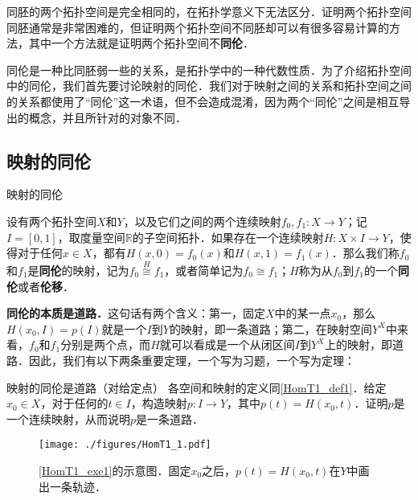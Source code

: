 
同胚的两个拓扑空间是完全相同的，在拓扑学意义下无法区分．证明两个拓扑空间同胚通常是非常困难的，但证明两个拓扑空间不同胚却可以有很多容易计算的方法，其中一个方法就是证明两个拓扑空间不\textbf{同伦}．

同伦是一种比同胚弱一些的关系，是拓扑学中的一种代数性质．为了介绍拓扑空间中的同伦，我们首先要讨论映射的同伦．我们对于映射之间的关系和拓扑空间之间的关系都使用了“同伦”这一术语，但不会造成混淆，因为两个“同伦”之间是相互导出的概念，并且所针对的对象不同．

\subsection{映射的同伦}

\begin{definition}{映射的同伦}\label{HomT1_def1}

设有两个拓扑空间$X$和$Y$，以及它们之间的两个连续映射$f_0, f_1:X\rightarrow Y$；记$I=[0, 1]$，取度量空间$\mathbb{R}$的子空间拓扑．如果存在一个连续映射$H: X\times I\rightarrow Y$，使得对于任何$x\in X$，都有$H(x, 0)=f_0(x)$和$H(x, 1)=f_1(x)$．那么我们称$f_0$和$f_1$是\textbf{同伦}的映射，记为$f_0\overset{H}{\cong} f_1$，或者简单记为$f_0\cong f_1$；$H$称为从$f_0$到$f_1$的一个\textbf{同伦}或者\textbf{伦移}．

\end{definition}

\textbf{同伦的本质是道路．}这句话有两个含义：第一，固定$X$中的某一点$x_0$，那么$H(x_0, I)=p(I)$就是一个$I$到$Y$的映射，即一条道路；第二，在映射空间$Y^X$中来看，$f_0$和$f_1$分别是两个点，而$H$就可以看成是一个从闭区间$I$到$Y^X$上的映射，即道路．因此，我们有以下两条重要定理，一个写为习题，一个写为定理：

\begin{exercise}{映射的同伦是道路（对给定点）}\label{HomT1_exe1}
各空间和映射的定义同\autoref{HomT1_def1}．给定$x_0\in X$，对于任何的$t\in I$，构造映射$p:I\rightarrow Y$，其中$p(t)=H(x_0, t)$．证明$p$是一个连续映射，从而说明$p$是一条道路．
\end{exercise}

\begin{figure}[ht]
\centering
\texttt{[image: ./figures/HomT1\_1.pdf]}
\caption{\autoref{HomT1_exe1}的示意图．固定$x_0$之后，$p(t)=H(x_0, t)$在$Y$中画出一条轨迹．} \label{HomT1_fig1}
\end{figure}



